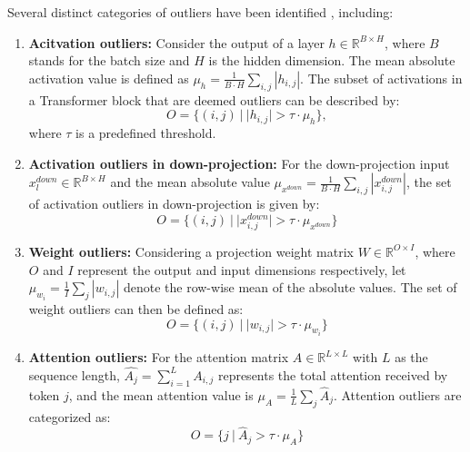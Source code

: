         Several distinct categories of outliers have been identified \cite{an2025systematicoutlierslargelanguage}, including:
        \begin{enumerate}
            \item \textbf{Acitvation outliers:} Consider the output of a layer $h \in \mathbb{R}^{B \times H}$, where $B$ stands for the batch size and $H$ is the hidden dimension. The mean absolute activation value is defined as $\mu_h = \frac{1}{B \cdot H} \sum_{i, j} |h_{i, j}|$. The subset of activations in a Transformer block that are deemed outliers can be described by:
            \begin{equation}\label{eq:layer_activation}
                O = \{(i, j) \: | \: |h_{i, j}| > \tau \cdot \mu_h\},
            \end{equation}
            where $\tau$ is a predefined threshold.
            
            \item \textbf{Activation outliers in down-projection:} For the down-projection input $x_l^{down} \in \mathbb{R}^{B \times H}$ and the mean absolute value $\mu_{x^{down}} = \frac{1}{B \cdot H} \sum_{i, j} |x_{i, j}^{down}|$, the set of activation outliers in down-projection is given by:
            \begin{equation}\label{eq:down_proj_activation}
                O = \{(i, j) \: | \: |x_{i, j}^{down}| > \tau \cdot \mu_{x^{down}}\}
            \end{equation}
            
            \item \textbf{Weight outliers:} Considering a projection weight matrix $W \in \mathbb{R}^{O \times I}$, where $O$ and $I$ represent the output and input dimensions respectively, let $\mu_{w_{i}} = \frac{1}{I}\sum_{j}|w_{i, j}|$ denote the row-wise mean of the absolute values. The set of weight outliers can then be defined as:
            \begin{equation}\label{eq:weight_outliers}
                O = \{(i, j) \: | \: |w_{i, j}| > \tau \cdot \mu_{w_i}\}
            \end{equation}
            
            \item \textbf{Attention outliers:} For the attention matrix $A \in \mathbb{R}^{L \times L}$ with $L$ as the sequence length, $\hat{A_j} = \sum_{i = 1}^L A_{i, j}$ represents the total attention received by token $j$, and the mean attention value is $\mu_A = \frac{1}{L} \sum_{j} \hat{A}_j$. Attention outliers are categorized as:
            \begin{equation}\label{eq:attention_outliers}
                O = \{j \: | \: \hat{A}_j > \tau \cdot \mu_A\}
            \end{equation}
        \end{enumerate}

